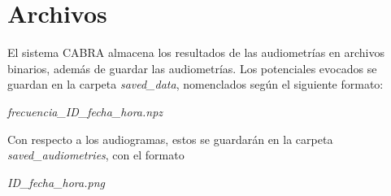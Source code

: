 \section{Archivos} \label{archivos}

El sistema CABRA almacena los resultados de las audiometrías en archivos binarios, además de guardar las
audiometrías.
Los potenciales evocados se guardan en la carpeta \textit{saved\_data}, nomenclados según el siguiente formato:

\begin{center}
    \textit{frecuencia\_ID\_fecha\_hora.npz}
\end{center}

Con respecto a los audiogramas, estos se guardarán en la carpeta \textit{saved\_audiometries}, con el formato

\begin{center}
    \textit{ID\_fecha\_hora.png}
\end{center}

